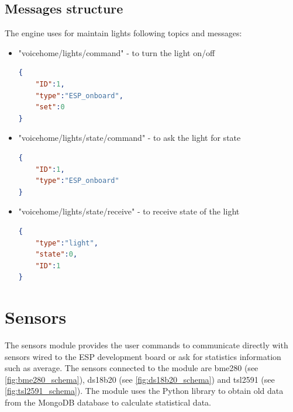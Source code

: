 \subsection{Messages structure}
The engine uses for maintain lights following topics and messages:

\begin{itemize}
    \item "voicehome/lights/command" - to turn the light on/off
    \begin{lstlisting}[language=json,firstnumber=1,caption={Structure of JSON message to turn on/off the light in module \textit{Lights}},captionpos=b,xleftmargin=1cm]
{
    "ID":1,
    "type":"ESP_onboard",
    "set":0
}
    \end{lstlisting}
    \item "voicehome/lights/state/command" - to ask the light for state
    \begin{lstlisting}[language=json,firstnumber=1,caption={Structure of JSON message to asking for the state of the light in module \textit{Lights}},captionpos=b,xleftmargin=1cm]
{
    "ID":1,
    "type":"ESP_onboard"
}
    \end{lstlisting}
    \item "voicehome/lights/state/receive" - to receive state of the light
    \begin{lstlisting}[language=json,firstnumber=1,caption={Structure of JSON message to receive state of the light in module \textit{Lights}},captionpos=b,xleftmargin=1cm]
{
    "type":"light",
    "state":0,
    "ID":1
}
    \end{lstlisting}
\end{itemize}

\section{Sensors}

The sensors module provides the user commands to communicate directly with sensors wired to the ESP development board or ask for statistics information such as average. The sensors connected to the module are bme280 (see \cref{fig:bme280_schema}), ds18b20 (see \cref{fig:ds18b20_schema}) and tsl2591 (see \cref{fig:tsl2591_schema}). The module uses the Python library to obtain old data from the MongoDB database to calculate statistical data.

